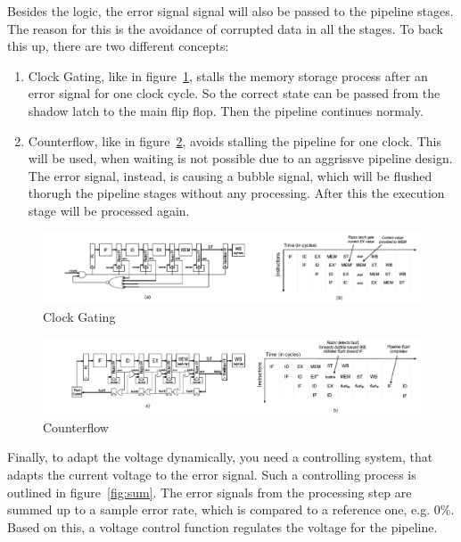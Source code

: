 \documentclass[12pt, a4paper]{article}
\begin{document}
	\newline
	Besides the logic, the error signal signal will also be passed to the pipeline stages. The reason for this is the avoidance of corrupted data in all the stages. To back this up, there are two different concepts\cite{book}: 
	\begin{enumerate}
		\item Clock Gating, like in figure~\ref{fig:cgate}, stalls the memory storage process after an error signal for one clock cycle. So the correct state can be passed from the shadow latch to the main flip flop. Then the pipeline continues normaly.
		\item Counterflow, like in figure~\ref{fig:cflow}, avoids stalling the pipeline for one clock. This will be used, when waiting is not possible due to an aggrissve pipeline design. The error signal, instead, is causing a bubble signal, which will be flushed thorugh the pipeline stages without any processing. After this the execution stage will be processed again.
	\end{enumerate} 
	\begin{figure}[ht]
		\begin{center}
			\includegraphics[width=14cm]{cgate.png}
		\end{center}
		\caption{Clock Gating\cite{picr}
			\label{fig:cgate}}
	\end{figure}
	\begin{figure}[ht]
		\begin{center}
			\includegraphics[width=14cm]{cflow.png}
		\end{center}
		\caption{Counterflow\cite{picr}
			\label{fig:cflow}}
	\end{figure}
	Finally, to adapt the voltage dynamically, you need a controlling system, that adapts the current voltage to the error signal. Such a controlling process is outlined in figure~\ref{fig:sum}. The error signals from the processing step are summed up to a sample error rate, which is compared to a reference one, e.g. 0\%. Based on this, a voltage control function regulates the voltage for the pipeline.
\end{document}
